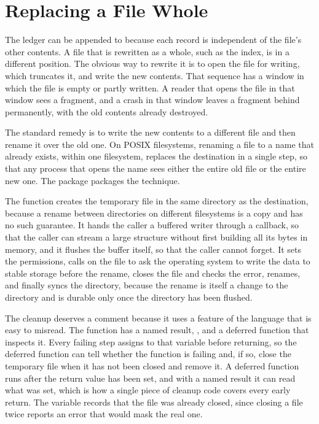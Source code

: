 \section{Replacing a File Whole}

The ledger can be appended to because each record is independent of the file's other contents. A file that is rewritten as a whole, such as the index, is in a different position. The obvious way to rewrite it is to open the file for writing, which truncates it, and write the new contents. That sequence has a window in which the file is empty or partly written. A reader that opens the file in that window sees a fragment, and a crash in that window leaves a fragment behind permanently, with the old contents already destroyed.

The standard remedy is to write the new contents to a different file and then rename it over the old one. On POSIX filesystems, renaming a file to a name that already exists, within one filesystem, replaces the destination in a single step, so that any process that opens the name sees either the entire old file or the entire new one. The package  packages the technique.


The function creates the temporary file in the same directory as the destination, because a rename between directories on different filesystems is a copy and has no such guarantee. It hands the caller a buffered writer through a callback, so that the caller can stream a large structure without first building all its bytes in memory, and it flushes the buffer itself, so that the caller cannot forget. It sets the permissions, calls  on the file to ask the operating system to write the data to stable storage before the rename, closes the file and checks the error, renames, and finally syncs the directory, because the rename is itself a change to the directory and is durable only once the directory has been flushed.

The cleanup deserves a comment because it uses a feature of the language that is easy to misread. The function has a named result, , and a deferred function that inspects it. Every failing step assigns to that variable before returning, so the deferred function can tell whether the function is failing and, if so, close the temporary file when it has not been closed and remove it. A deferred function runs after the return value has been set, and with a named result it can read what was set, which is how a single piece of cleanup code covers every early return. The variable  records that the file was already closed, since closing a file twice reports an error that would mask the real one.


